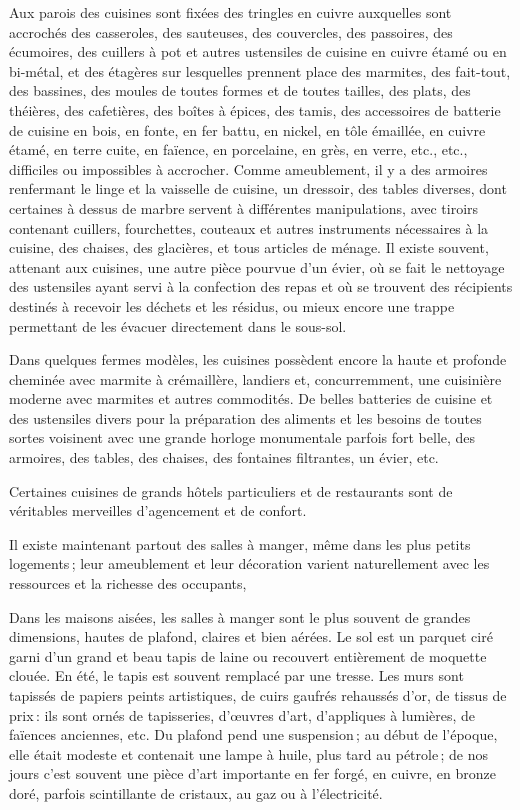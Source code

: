 {Aux parois des cuisines sont fixées des tringles en cuivre auxquelles sont
accrochés des casseroles, des sauteuses, des couvercles, des passoires, des
écumoires, des cuillers à pot et autres ustensiles de cuisine en cuivre étamé
ou en bi-métal, et des étagères sur lesquelles prennent place des marmites, des
fait-tout, des bassines, des moules de toutes formes et de toutes tailles, des
plats, des théières, des cafetières, des boîtes à épices, des tamis, des
accessoires de batterie de cuisine en bois, en fonte, en fer battu, en nickel,
en tôle émaillée, en cuivre étamé, en terre cuite, en faïence, en porcelaine,
en grès, en verre, etc., etc., difficiles ou impossibles à accrocher. Comme
ameublement, il y a des armoires renfermant le linge et la vaisselle de
cuisine, un dressoir, des tables diverses, dont certaines à dessus de marbre
servent à différentes manipulations, avec tiroirs contenant cuillers,
fourchettes, couteaux et autres instruments nécessaires à la cuisine, des
chaises, des glacières, et tous articles de ménage. Il existe souvent, attenant
aux cuisines, une autre pièce pourvue d'un évier, où se fait le nettoyage des
ustensiles ayant servi à la confection des repas et où se trouvent des
récipients destinés à recevoir les déchets et les résidus, ou mieux encore une
trappe permettant de les évacuer directement dans le sous-sol.

Dans quelques fermes modèles, les cuisines possèdent encore la haute et
profonde cheminée avec marmite à crémaillère, landiers et, concurremment, une
cuisinière moderne avec marmites et autres commodités. De belles batteries de
cuisine et des ustensiles divers pour la préparation des aliments et les
besoins de toutes sortes voisinent avec une grande horloge monumentale parfois
fort belle, des armoires, des tables, des chaises, des fontaines filtrantes, un
évier, etc.

Certaines cuisines de grands hôtels particuliers et de restaurants sont de
véritables merveilles d'agencement et de confort.

Il existe maintenant partout des salles à manger, même dans les plus petits
logements ; leur ameublement et leur décoration varient naturellement avec les
ressources et la richesse des occupants,

Dans les maisons aisées, les salles à manger sont le plus souvent de grandes
dimensions, hautes de plafond, claires et bien aérées. Le sol est un parquet
ciré garni d'un grand et beau tapis de laine ou recouvert entièrement de
moquette clouée. En été, le tapis est souvent remplacé par une tresse. Les murs
sont tapissés de papiers peints artistiques, de cuirs gaufrés rehaussés d'or,
de tissus de prix : ils sont ornés de tapisseries, d'œuvres d'art, d'appliques
à lumières, de faïences anciennes, etc. Du plafond pend une suspension ; au
début de l'époque, elle était modeste et contenait une lampe à huile, plus tard
au pétrole ; de nos jours c'est souvent une pièce d'art importante en fer
forgé, en cuivre, en bronze doré, parfois scintillante de cristaux, au gaz ou
à l'électricité.

}
